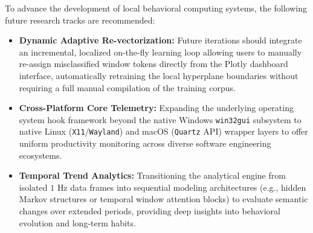 \documentclass[conference]{IEEEtran}
\begin{document}
To advance the development of local behavioral computing systems, the following future research tracks are recommended:
\begin{itemize}
    \item \textbf{Dynamic Adaptive Re-vectorization:} Future iterations should integrate an incremental, localized on-the-fly learning loop allowing users to manually re-assign misclassified window tokens directly from the Plotly dashboard interface, automatically retraining the local hyperplane boundaries without requiring a full manual compilation of the training corpus.
    \item \textbf{Cross-Platform Core Telemetry:} Expanding the underlying operating system hook framework beyond the native Windows \texttt{win32gui} subsystem to native Linux (\texttt{X11}/\texttt{Wayland}) and macOS (\texttt{Quartz} API) wrapper layers to offer uniform productivity monitoring across diverse software engineering ecosystems.
    \item \textbf{Temporal Trend Analytics:} Transitioning the analytical engine from isolated $1\text{ Hz}$ data frames into sequential modeling architectures (e.g., hidden Markov structures or temporal window attention blocks) to evaluate semantic changes over extended periods, providing deep insights into behavioral evolution and long-term habits.
\end{itemize}
\end{document}
